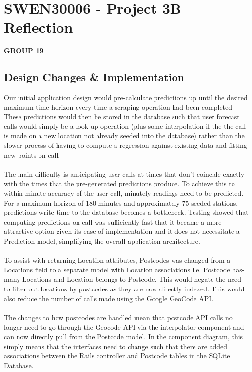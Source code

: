 \documentclass[10pt]{article}
\begin{document}
\section*{SWEN30006 - Project 3B Reflection}

\textbf{GROUP 19}

\subsection*{Design Changes \& Implementation}

\noindent Our initial application design would pre-calculate predictions up until the desired maximum time horizon every time a scraping operation had been completed. These predictions would then be stored in the database such that user forecast calls would simply be a look-up operation (plus some interpolation if the the call is made on a new location not already seeded into the database) rather than the slower process of having to compute a regression against existing data and fitting new points on call. \\\\
The main difficulty is anticipating user calls at times that don't coincide exactly with the times that the pre-generated predictions produce. To achieve this to within minute accuracy of the user call, minutely readings need to be predicted. For a maximum horizon of 180 minutes and approximately 75 seeded stations, predictions write time to the database becomes a bottleneck. Testing showed that computing predictions on call was sufficiently fast that it became a more attractive option given its ease of implementation and it does not necessitate a Prediction model, simplifying the overall application architecture. \\\\ 
To assist with returning Location attributes, Postcodes was changed from a Locations field to a separate model with Location associations i.e. Postcode has-many Locations and Location belongs-to Postcode. This would negate the need to  filter out locations by postcodes as they are now directly indexed. This would also reduce the number of calls made using the Google GeoCode API. \\\\
The changes to how postcodes are handled mean that postcode API calls no longer need to go through the Geocode API via the interpolator component and can now directly pull from the Postcode model. In the component diagram, this simply means that the interfaces need to change such that there are added associations between the Rails controller and Postcode tables in the SQLite Database. \\\\
\end{document}
